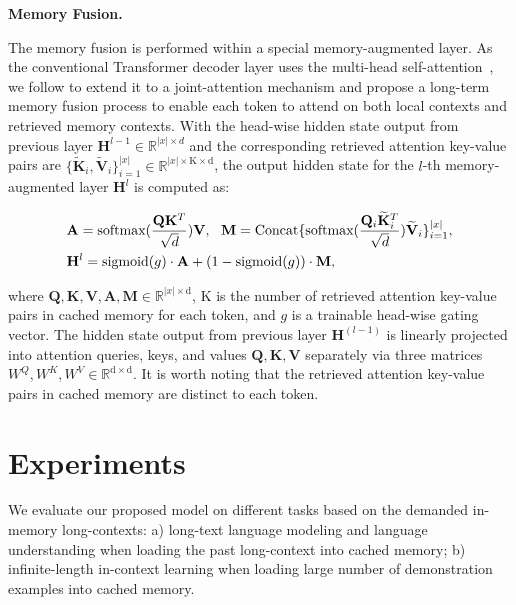 \textbf{Memory Fusion.}

The memory fusion is performed within a special memory-augmented layer. As the conventional Transformer decoder layer uses the multi-head self-attention~\cite{Vaswani2017AttentionIA}, we follow \cite{Wu2022MemorizingT} to extend it to a joint-attention mechanism and propose a long-term memory fusion process to enable each token to attend on both local contexts and retrieved memory contexts. With the head-wise hidden state output from previous layer $\mathbf{H}^{l-1}\in\mathbb{R}^{|x|\times d}$ and the corresponding retrieved attention key-value pairs are $\{\widetilde{\mathbf{K}}_{i},\widetilde{\mathbf{V}}_{i}\}_{i=1}^{|x|}\in \mathbb{R}^{|x|\times\mathrm{K}\times\mathrm{d}} $, the output hidden state for the $l$-th memory-augmented layer $\mathbf{H}^l$ is computed as:

\begin{align}

&\mathbf{A} = \textnormal{softmax}(\frac{\mathbf{Q}\mathbf{K}^T}{\sqrt{d}})\mathbf{V}, \ \ \mathbf{M} = \textnormal{Concat}\{\textnormal{softmax}(\frac{\mathbf{Q}_i \widetilde{\mathbf{K}}_{i}^T}{\sqrt{d}})\widetilde{\mathbf{V}}_{i}\}_{i=1}^{|x|}, \\
&\mathbf{H}^l = \textnormal{sigmoid}(g)\cdot \mathbf{A} + (1-\textnormal{sigmoid}(g))\cdot \mathbf{M},
\end{align}

where $\mathbf{Q},\mathbf{K}, \mathbf{V},\mathbf{A},\mathbf{M}\in \mathbb{R}^{|x|\times \mathrm{d}}$, $\mathrm{K}$ is the number of retrieved attention key-value pairs in cached memory for each token, and $g$ is a trainable head-wise gating vector. The hidden state output from previous layer $\mathbf{H}^{(l-1)}$ is linearly projected into attention queries, keys, and values $\mathbf{Q},\mathbf{K},\mathbf{V}$ separately via three matrices $W^Q, W^K, W^V\in \mathbb{R}^{\mathrm{d}\times \mathrm{d}}$. It is worth noting that the retrieved attention key-value pairs in cached memory are distinct to each token.

\section{Experiments}
\label{sec:exp}

We evaluate our proposed \our{} model on different tasks based on the demanded in-memory long-contexts: a) long-text language modeling and language understanding when loading the past long-context into cached memory; b) infinite-length in-context learning when loading large number of demonstration examples into cached memory.

